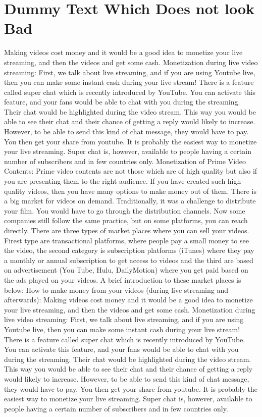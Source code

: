 \documentclass[]{book}
\begin{document}
\section{Dummy Text Which Does not look Bad}
Making videos cost money and it would be a good idea to monetize your live streaming, and then the videos and get some cash.
Monetization during live video streaming:
First, we talk about live streaming, and if you are using Youtube live, then you can make some instant cash during your live stream! There is a feature called super chat which is recently introduced by YouTube.  You can activate this feature, and your fans would be able to chat with you during the streaming. Their chat would be highlighted during the video stream. This way you would be able to see their chat and their chance of getting a reply would likely to increase. However,  to be able to send this kind of chat message, they would have to pay.  You then get your share from youtube. It is probably the easiest way to monetize your live streaming. Super chat is, however, available to people having a certain number of subscribers and in few countries only.
Monetization of Prime Video Contents:
Prime video contents are not those which are of high quality but also if you are presenting them to the right audience.  If you have created such high-quality videos, then you have many options to make money out of them.  There is a big market for videos on demand. Traditionally, it was a challenge to distribute your film. You would have to go through the distribution channels. Now some companies still follow the same practice, but on some platforms, you can reach directly. There are three types of market places where you can sell your videos. Firest type are transactional platforms, where people pay a small money to see the video, the second category is subscription platforms (iTunes) where they pay a monthly or annual subscription to get access to videos and the third are based on advertisement (You Tube, Hulu, DailyMotion) where you get paid based on the ads played on your videos. A brief introduction to these market places is below:
How to make money from your videos (during live streaming and afterwards):
Making videos cost money and it would be a good idea to monetize your live streaming, and then the videos and get some cash.
Monetization during live video streaming:
First, we talk about live streaming, and if you are using Youtube live, then you can make some instant cash during your live stream! There is a feature called super chat which is recently introduced by YouTube.  You can activate this feature, and your fans would be able to chat with you during the streaming. Their chat would be highlighted during the video stream. This way you would be able to see their chat and their chance of getting a reply would likely to increase. However,  to be able to send this kind of chat message, they would have to pay.  You then get your share from youtube. It is probably the easiest way to monetize your live streaming. Super chat is, however, available to people having a certain number of subscribers and in few countries only.
\end{document}
